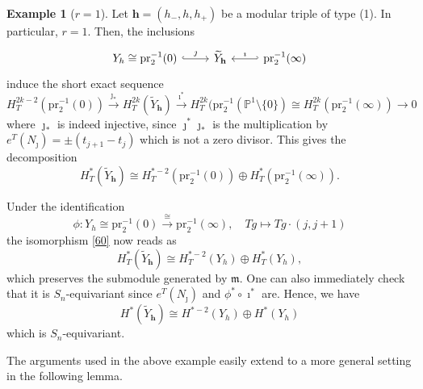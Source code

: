 \documentclass[11pt]{article}
\theoremstyle{definition}
\newtheorem{example}[theo]{Example}
\numberwithin{equation}{section}
\numberwithin{equation}{section}
\newcommand{\PP}{\mathbb{P}}
\newcommand\tY{{\widetilde{Y}}}
\newcommand\lra{\longrightarrow }
\newcommand\beq{\begin{equation}}
\newcommand\eeq{\end{equation}}
\newcommand\pr{\mathrm{pr}}
\newcommand\bh{\mathbf{h}}
\begin{document}
\begin{example}[$r=1$]
	Let $\bh=(h_-,h,h_+)$ be a modular triple of type (1). In particular, $r=1$. Then, the inclusions
	\[\begin{tikzcd}Y_h\cong \pr_2^{-1}(0)\ar[r, hook, "\jmath"] & \tY_\bh & \pr_2^{-1}(\infty)\ar[l, hook', "\imath", labels=above]\end{tikzcd}\]
	induce the short exact sequence
	\[H_T^{2k-2}(\pr_2^{-1}(0))\xrightarrow{~\jmath_*~} H_T^{2k}(\tY_\bh)\xrightarrow{~\imath^*~} H^{2k}_T(\pr_2^{-1}(\PP^1\setminus\{0\})\cong H_T^{2k}(\pr_2^{-1}(\infty))\lra 0\]
	where $\jmath_*$ is indeed injective, since $\jmath^*\jmath_*$ is the multiplication by $e^T(N_\jmath)=\pm (t_{j+1}-t_j)$ which is not a zero divisor. 
	This gives the decomposition
	\beq \label{60} H^*_T(\tY_\bh)\cong  H^{*-2}_T(\pr_2^{-1}(0))\oplus H^*_T(\pr_2^{-1}(\infty)).\eeq 


	Under the identification 
	\[\phi: Y_h\cong \pr_2^{-1}(0)\xrightarrow{~\cong~}\pr_2^{-1}(\infty), \quad Tg\mapsto Tg\cdot (j,j+1)\] 
	the isomorphism \eqref{60} now reads as 
	\[H^*_T(\tY_\bh)\cong H^{*-2}_T(Y_h)\oplus H^*_T(Y_h),\]
	which preserves the submodule generated by $\mathfrak{m}$. One can also immediately check that it is $S_n$-equivariant since $e^T(N_\jmath)$ and $\phi^*\circ \imath^*$ are. 
	Hence, we have
	\[H^*(\tY_\bh)\cong H^{*-2}(Y_h)\oplus H^*(Y_h)\]
	which is $S_n$-equivariant.
	\end{example}
	The arguments used in the above example easily extend to a more general setting in the following lemma.
\end{document}
